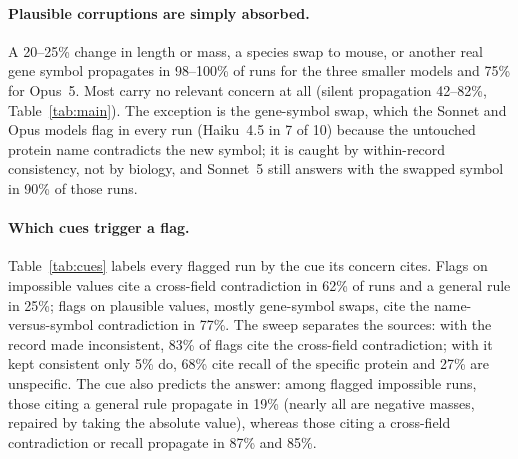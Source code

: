 \documentclass{article}
\begin{document}
\paragraph{Plausible corruptions are simply absorbed.} A 20--25\% change in length or mass, a species swap to mouse, or another real gene symbol propagates in 98--100\% of runs for the three smaller models and 75\% for Opus~5. Most carry no relevant concern at all (silent propagation 42--82\%, Table~\ref{tab:main}). The exception is the gene-symbol swap, which the Sonnet and Opus models flag in every run (Haiku~4.5 in 7 of 10) because the untouched protein name contradicts the new symbol; it is caught by within-record consistency, not by biology, and Sonnet~5 still answers with the swapped symbol in 90\% of those runs.

\paragraph{Which cues trigger a flag.} Table~\ref{tab:cues} labels every flagged run by the cue its concern cites. Flags on impossible values cite a cross-field contradiction in 62\% of runs and a general rule in 25\%; flags on plausible values, mostly gene-symbol swaps, cite the name-versus-symbol contradiction in 77\%. The sweep separates the sources: with the record made inconsistent, 83\% of flags cite the cross-field contradiction; with it kept consistent only 5\% do, 68\% cite recall of the specific protein and 27\% are unspecific. The cue also predicts the answer: among flagged impossible runs, those citing a general rule propagate in 19\% (nearly all are negative masses, repaired by taking the absolute value), whereas those citing a cross-field contradiction or recall propagate in 87\% and 85\%.

\begin{table}[t]
  \centering
  \caption{Cue cited by flagged concerns, \% of flagged runs (cues not exclusive; pooled over models, baseline prompt; per-model values in Appendix~\ref{app:stats}).}
  \label{tab:cues}
  \footnotesize
  
\end{table}
\end{document}
